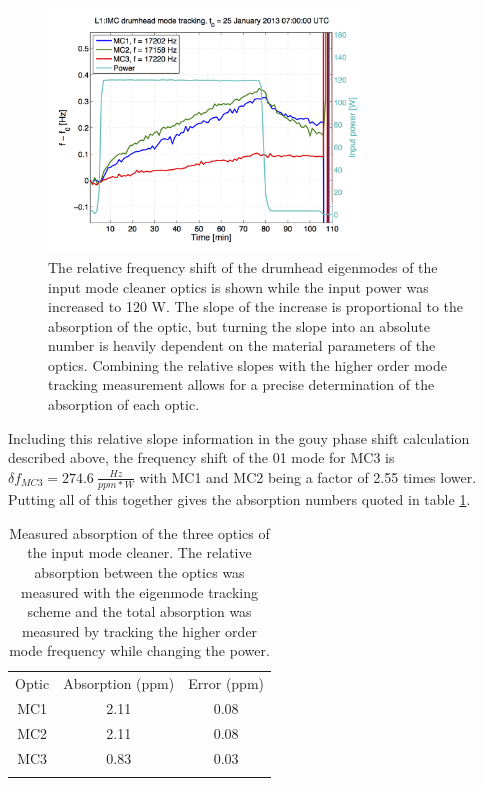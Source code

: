 \documentclass[10pt]{article}
\begin{document}
\begin{figure}
	\centering
	\includegraphics[width = 0.75\textwidth]{Mode_Tracking.png}
	\caption{The relative frequency shift of the drumhead eigenmodes of the input 
		mode cleaner optics is shown while the input power was increased to 120 W.  
		The slope of the increase is proportional to the absorption of the optic, 
		but turning the slope into an absolute number is heavily dependent on the 
		material parameters of the optics.  
		Combining the relative slopes with the higher order mode tracking measurement 
		allows for a precise determination of the absorption of each optic.}
	\label{fig:ModeTracking}
\end{figure}	

Including this relative slope information in the gouy phase shift calculation described 
above, the frequency shift of the 01 mode for MC3 is $\delta f_{MC3}=274.6\ \tfrac{Hz}{ppm*W}$ 
with MC1 and MC2 being a factor of 2.55 times lower.  
Putting all of this together gives the absorption numbers quoted in table \ref{tab:Absorption}.

\begin{table}
	\centering
	\begin{tabular}{|c||c|c|}
		\hhline{|--|-|}
		Optic & Absorption (ppm) & Error (ppm)\\
		\hhline{|=#=|=|}
		MC1 & 2.11 & 0.08 \\
		\hhline{|--|-|}
		MC2 & 2.11 & 0.08 \\
		\hhline{|--|-|}
		MC3 & 0.83 & 0.03 \\
		\hhline{|--|-|}
	\end{tabular}
	\caption{Measured absorption of the three optics of the input mode cleaner.  
		The relative absorption between the optics was measured with the eigenmode tracking 
		scheme and the total absorption was measured by tracking the higher order mode 
		frequency while changing the power.}
	\label{tab:Absorption}	
\end{table}	
\end{document}
